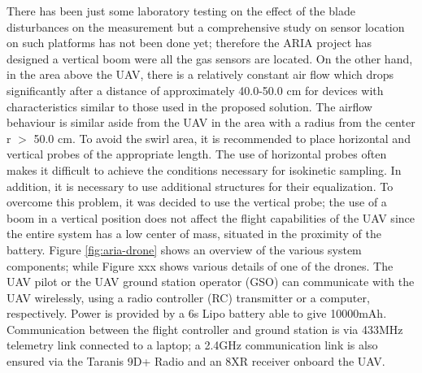 There has been just some laboratory testing on the effect of the blade disturbances on the measurement \cite{8453584}
but a comprehensive study on sensor location on such platforms has not been done yet; therefore
the ARIA project has designed a vertical boom were all the gas sensors are located. On the other
hand, in the area above the UAV, there is a relatively constant air flow which drops significantly after
a distance of approximately 40.0-50.0 cm for devices with characteristics similar to those used in the
proposed solution. The airflow behaviour is similar aside from the UAV in the area with a radius from
the center r $>$ 50.0 cm. To avoid the swirl area, it is recommended to place horizontal and vertical
probes of the appropriate length. The use of horizontal probes often makes it difficult to achieve the
conditions necessary for isokinetic sampling. In addition, it is necessary to use additional structures for their equalization. To overcome this problem, it was decided to use the vertical probe; the use of a
boom in a vertical position does not affect the flight capabilities of the UAV since the entire system has
a low center of mass, situated in the proximity of the battery.
Figure \ref{fig:aria-drone} shows an overview of the various system components; while Figure xxx shows various details of one of the drones.
The UAV pilot or the UAV ground station operator (GSO) can communicate with the UAV
wirelessly, using a radio controller (RC) transmitter or a computer, respectively.
Power is provided by a 6s Lipo battery able to give 10000mAh. Communication
between the flight controller and ground station is via 433MHz telemetry link connected to a laptop; a
2.4GHz communication link is also ensured via the Taranis 9D+ Radio and an 8XR receiver onboard the
UAV.
